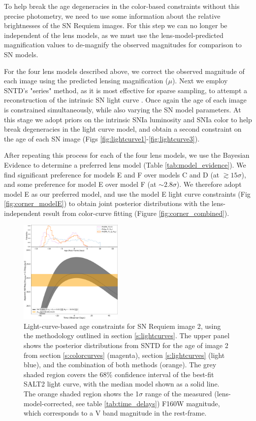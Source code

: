 \documentclass[12pt,dvipsnames]{article}
\def\SNABC{SN Requiem\xspace}
\begin{document}
To help break the age degeneracies in the color-based constraints without this precise photometry, we need to use some information about the relative brightnesses of the SN Requiem images.  For this step we can no longer be independent of the lens models, as we must use the lens-model-predicted magnification values to de-magnify the observed magnitudes for comparison to SN models. 

For the four lens models described above, we correct the observed magnitude of each image using the predicted lensing magnification ($\mu$). Next we employ SNTD's "series" method, as it is most effective for sparse sampling, to attempt a reconstruction of the intrinsic SN light curve \cite{pierel_turning_2019}. Once again the age of each image is constrained simultaneously, while also varying the SN model parameters. At this stage we adopt priors on the intrinsic SNIa luminosity \cite{rodney_type_2014} and SNIa color \cite{mosher_cosmological_2014} to help break degeneracies in the light curve model, and obtain a second constraint on the age of each SN image (Figs \ref{fig:lightcurve1}-\ref{fig:lightcurve3}). 

After repeating this process for each of the four lens models, we use the Bayesian Evidence to determine a preferred lens model (Table \ref{tab:model_evidence}). We find significant preference for models E and F over models C and D (at $\gtrsim15\sigma$), and some preference for model E over model F (at $\sim2.8\sigma$). We therefore adopt model E as our preferred model, and use the model E light curve constraints (Fig \ref{fig:corner_modelE}) to obtain joint posterior distributions with the lens-independent result from color-curve fitting (Figure \ref{fig:corner_combined}). 


\begin{figure}[h!]
    \centering
    \includegraphics[width=0.45\textwidth]{Images/lightcurve_image2.pdf}
    \caption{Light-curve-based age constraints for \SNABC image 2, using the methodology outlined in section \ref{s:lightcurves}. The upper panel shows the posterior distributions from SNTD for the age of image 2 from section \ref{s:colorcurves} (magenta), section \ref{s:lightcurves} (light blue), and the combination of both methods (orange). The grey shaded region covers the 68\% confidence interval of the best-fit SALT2 light curve, with the median model shown as a solid line. The orange shaded region shows the 1$\sigma$ range of the measured (lens-model-corrected, see table \ref{tab:time_delays}) F160W magnitude, which corresponds to a V band magnitude in the rest-frame. }
    \label{fig:lightcurve2}
\end{figure}
\end{document}

